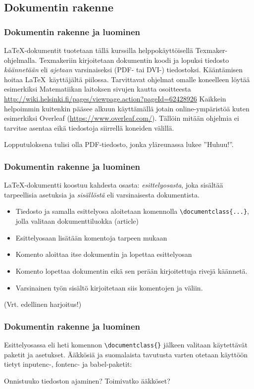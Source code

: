 \subsection{Dokumentin rakenne}
\begin{frame}[fragile]
    \frametitle{Dokumentin rakenne ja luominen}
    \LaTeX-dokumentit tuotetaan tällä kurssilla helppokäyttöisellä Texmaker-ohjelmalla.
    \pause
    \vaihto
    Texmakeriin kirjoitetaan dokumentin koodi ja lopuksi tiedosto \textit{käännetään} eli \textit{ajetaan} varsinaiseksi (PDF- tai DVI-) tiedostoksi. Kääntämisen hoitaa \LaTeX\ käyttäjältä piilossa.
    \pause
    \vaihto
    Tarvittavat ohjelmat omalle koneelleen löytää esimerkiksi Matematiikan laitoksen sivujen kautta osoitteesta
    \url{http://wiki.helsinki.fi/pages/viewpage.action?pageId=62428926}
    \pause
    \vaihto
    Kaikkein helpoimmin kuitenkin pääsee alkuun käyttämällä jotain online-ympäristöä kuten esimerkiksi Overleaf (\url{https://www.overleaf.com/}). Tällöin mitään ohjelmia ei tarvitse asentaa eikä tiedostoja siirrellä koneiden välillä.
\end{frame}
\begin{frame}[fragile]
    
    Lopputuloksena tulisi olla PDF-tiedosto, jonka yläreunassa lukee ''Huhuu!''.
\end{frame}
\begin{frame}[fragile]
    \frametitle{Dokumentin rakenne ja luominen}
    \LaTeX-dokumentti koostuu kahdesta osasta: \textit{esittelyosasta}, joka sisältää tarpeellisia asetuksia ja \textit{sisällöstä} eli varsinaisesta dokumentista.
    \pause
    \begin{itemize}[<+->]
        \item Tiedosto ja samalla esittelyosa aloitetaan komennolla \verb+\documentclass{...}+, jolla valitaan dokumenttiluokka (article)
        \item Esittelyosaan lisätään komentoja tarpeen mukaan
        \item Komento \verb++ aloittaa itse dokumentin ja lopettaa esittelyosan
        \item Komento \verb++  lopettaa dokumentin eikä sen perään kirjoitettuja rivejä käännetä.
        \item Varsinainen työn sisältö kirjoitetaan siis komentojen \verb++  ja  \verb++  väliin.
    \end{itemize}
    (Vrt. edellinen harjoitus!)
\end{frame}
\begin{frame}[fragile]
    \frametitle{Dokumentin rakenne ja luominen}
    Esittelyosassa eli heti komennon \verb+\documentclass{}+  jälkeen valitaan käytettävät paketit ja asetukset. \pause Ääkkösiä ja suomalaista tavutusta varten otetaan käyttöön tietyt inputenc-, fontenc- ja babel-paketit:\pause
    
    Onnistuuko tiedoston ajaminen? Toimivatko ääkköset?
\end{frame}
